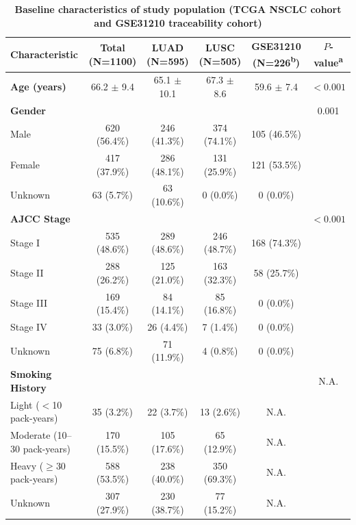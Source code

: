\documentclass[pdflatex,sn-mathphys-num,referee,lineno]{sn-jnl}
\theoremstyle{thmstyleone}%
\theoremstyle{thmstyletwo}%
\theoremstyle{thmstylethree}%
\begin{document}
\begin{table}
    \scriptsize
    \caption{\textbf{Baseline characteristics of study population (TCGA NSCLC cohort and GSE31210 traceability cohort)}}\label{tab:baseline}
        \begin{tabular*}{\textwidth}{@{\extracolsep\fill}lccccc}
            \toprule
            Characteristic & Total (N=1100) & LUAD (N=595) & LUSC (N=505) & GSE31210 (N=226\textsuperscript{b}) & $P$-value\textsuperscript{a} \\
            \midrule
            \textbf{Age (years)} & 66.2 $\pm$ 9.4 & 65.1 $\pm$ 10.1 & 67.3 $\pm$ 8.6 & 59.6 $\pm$ 7.4 & $<0.001$ \\
            \addlinespace
            \textbf{Gender} & & & & & 0.001 \\
            \quad Male & 620 (56.4\%) & 246 (41.3\%) & 374 (74.1\%) & 105 (46.5\%) & \\
            \quad Female & 417 (37.9\%) & 286 (48.1\%) & 131 (25.9\%) & 121 (53.5\%) & \\
            \quad Unknown & 63 (5.7\%) & 63 (10.6\%) & 0 (0.0\%) & 0 (0.0\%) & \\
            \addlinespace
            \textbf{AJCC Stage} & & & & & $<0.001$ \\
            \quad Stage I & 535 (48.6\%) & 289 (48.6\%) & 246 (48.7\%) & 168 (74.3\%) & \\
            \quad Stage II & 288 (26.2\%) & 125 (21.0\%) & 163 (32.3\%) & 58 (25.7\%) & \\
            \quad Stage III & 169 (15.4\%) & 84 (14.1\%) & 85 (16.8\%) & 0 (0.0\%) & \\
            \quad Stage IV & 33 (3.0\%) & 26 (4.4\%) & 7 (1.4\%) & 0 (0.0\%) & \\
            \quad Unknown & 75 (6.8\%) & 71 (11.9\%) & 4 (0.8\%) & 0 (0.0\%) & \\
            \addlinespace
            \textbf{Smoking History} & & & & & N.A. \\
            \quad Light ($<$10 pack-years) & 35 (3.2\%) & 22 (3.7\%) & 13 (2.6\%) & N.A. & \\
            \quad Moderate (10--30 pack-years) & 170 (15.5\%) & 105 (17.6\%) & 65 (12.9\%) & N.A. & \\
            \quad Heavy ($\ge$30 pack-years) & 588 (53.5\%) & 238 (40.0\%) & 350 (69.3\%) & N.A. & \\
            \quad Unknown & 307 (27.9\%) & 230 (38.7\%) & 77 (15.2\%) & N.A. & \\

\end{tabular*}
\end{table}
\end{document}
